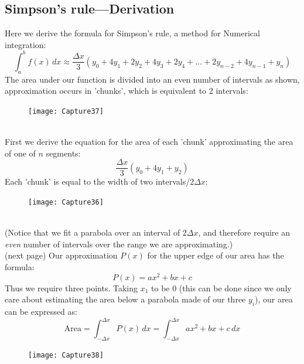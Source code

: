 \documentclass{report}
\begin{document}
\subsection{Simpson's rule---Derivation} %
Here we derive the formula for Simpson's rule, a method for Numerical integration:
\begin{equation*}
\int_a^bf(x)\,dx\approx \frac{\Delta x}{3}(y_0+4y_1+2y_2
+4y_3+2y_4+\ldots+2y_{n-2}+4y_{n-1}+y_n) 
\end{equation*}
The area under our function is divided into an even number of intervals 
as shown, approximation occurs in 'chunks', which is equivalent to 2 intervals:
\begin{figure}[h]
\texttt{[image: Capture37]}\\
\centering
{}
\end{figure}\\
First we derive the equation for the area of each 'chunk' approximating the area of
one of $n$ segments:
\begin{equation*}
\frac{\Delta x}{3}(y_0+4y_1+y_2)
\end{equation*}
Each 'chunk' is equal to the width of two intervals/$2\Delta x$:
\begin{figure}[h]
\texttt{[image: Capture36]}\\
\centering
{}
\end{figure}\\
(Notice that we fit a parabola over an interval of $2\Delta x$, and therefore
require an \textit{even} number of intervals over the range we are approximating.)\\
(next page)
\newpage
\noindent Our approximation $P(x)$ for the upper edge of our area has the formula:
\begin{equation*}
P(x)=ax^2+bx+c
\end{equation*}
Thus we require three points. Taking $x_1$ to be 0 (this can be done since we only care
about estimating the area below a parabola made of our three $y_i$),
our area can be expressed as:
\begin{equation*}
\text{Area}=\int_{-\Delta x}^{\Delta x}P(x)\,dx=\int_{-\Delta x}^{\Delta x}ax^2+bx+c\,dx
\end{equation*}
\begin{figure}[h]
\texttt{[image: Capture38]}\\
\centering
{}
\end{figure}\\
\end{document}
